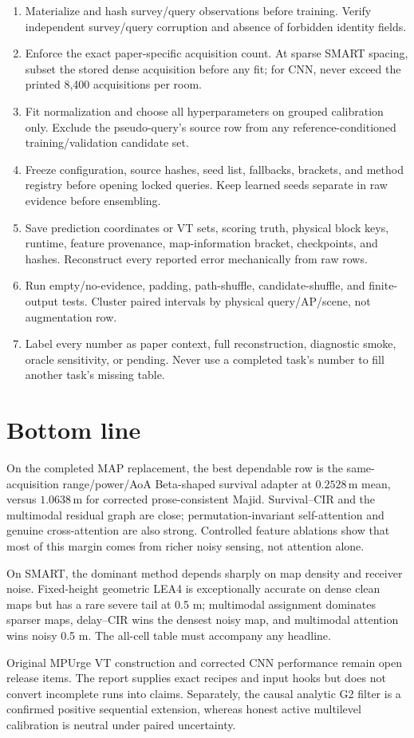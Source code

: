 \documentclass[10pt]{article}
\newcommand{\m}{\,\mathrm m}
\begin{document}
\begin{enumerate}
\item Materialize and hash survey/query observations before training.  Verify
independent survey/query corruption and absence of forbidden identity fields.
\item Enforce the exact paper-specific acquisition count.  At sparse SMART
spacing, subset the stored dense acquisition before any fit; for CNN, never
exceed the printed 8,400 acquisitions per room.
\item Fit normalization and choose all hyperparameters on grouped calibration
only.  Exclude the pseudo-query's source row from any reference-conditioned
training/validation candidate set.
\item Freeze configuration, source hashes, seed list, fallbacks, brackets, and
method registry before opening locked queries.  Keep learned seeds separate in
raw evidence before ensembling.
\item Save prediction coordinates or VT sets, scoring truth, physical block
keys, runtime, feature provenance, map-information bracket, checkpoints, and
hashes.  Reconstruct every reported error mechanically from raw rows.
\item Run empty/no-evidence, padding, path-shuffle, candidate-shuffle, and
finite-output tests.  Cluster paired intervals by physical query/AP/scene, not
augmentation row.
\item Label every number as paper context, full reconstruction, diagnostic
smoke, oracle sensitivity, or pending.  Never use a completed task's number to
fill another task's missing table.
\end{enumerate}

\section{Bottom line}

On the completed MAP replacement, the best dependable row is the
same-acquisition range/power/AoA Beta-shaped survival adapter at $0.2528\m$
mean, versus $1.0638\m$ for corrected prose-consistent Majid.  Survival--CIR
and the multimodal residual graph are close; permutation-invariant
self-attention and genuine cross-attention are also strong.  Controlled
feature ablations show that most of this margin comes from richer noisy sensing,
not attention alone.

On SMART, the dominant method depends sharply on map density and receiver
noise.  Fixed-height geometric LEA4 is exceptionally accurate on dense clean
maps but has a rare severe tail at 0.5 m; multimodal assignment dominates
sparser maps, delay--CIR wins the densest noisy map, and multimodal attention
wins noisy 0.5 m.  The all-cell table must accompany any headline.

Original MPUrge VT construction and corrected CNN performance remain open
release items.  The report supplies exact recipes and input hooks but does not
convert incomplete runs into claims.  Separately, the causal analytic G2
filter is a confirmed positive sequential extension, whereas honest active
multilevel calibration is neutral under paired uncertainty.
\end{document}
